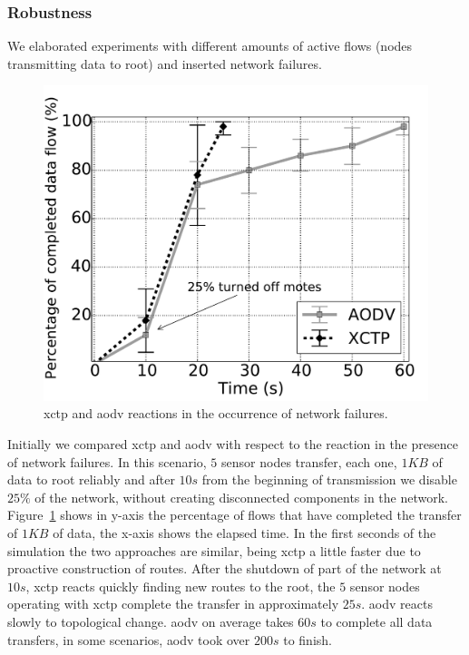 \subsubsection{Robustness}
\label{sec:robustness}

We elaborated experiments with different amounts of active flows (nodes transmitting data to root) and inserted network failures.

\begin{figure}[ht]
\centerline{
    \includegraphics[width=0.55\linewidth]{img/reacao-xctp-vs-aodv-line2}
} \caption{\ac{xctp} and \ac{aodv} reactions in the occurrence of network failures.} \label{fig:reaction-aodv-vs-xctp}
\end{figure}

Initially we compared \ac{xctp} and \ac{aodv} with respect to the reaction in
the presence of network failures. In this scenario, $5$ sensor nodes transfer,
each one, $1KB$ of data to root reliably and after $10s$ from the beginning of
transmission we disable $25\%$ of the network, without creating disconnected
components in the network. Figure~\ref{fig:reaction-aodv-vs-xctp} shows in
y-axis the percentage of flows that have completed the transfer of $1KB$ of
data, the x-axis shows the elapsed time. In the first seconds of the simulation
the two approaches are similar, being \ac{xctp} a little faster due to
proactive construction of routes. After the shutdown of part of the network at
$10s$, \ac{xctp} reacts quickly finding new routes to the root, the $5$ sensor
nodes operating with \ac{xctp} complete the transfer in
approximately $25s$. \ac{aodv} reacts slowly to topological
change. \ac{aodv} on average takes $60s$ to complete all data transfers, in some scenarios, \ac{aodv} took over $200s$ to finish.


